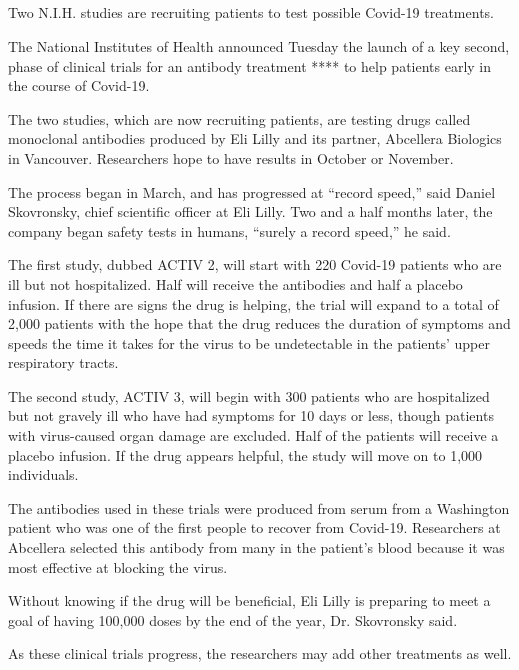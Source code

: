 \hypertarget{-6}{%
\subsection{}\label{-6}}

Two N.I.H. studies are recruiting patients to test possible Covid-19
treatments.

The National Institutes of Health announced Tuesday the launch of a key
second, phase of clinical trials for an antibody treatment **** to help
patients early in the course of Covid-19.

The two studies, which are now recruiting patients, are testing drugs
called monoclonal antibodies produced by Eli Lilly and its partner,
Abcellera Biologics in Vancouver. Researchers hope to have results in
October or November.

The process began in March, and has progressed at ``record speed,'' said
Daniel Skovronsky, chief scientific officer at Eli Lilly. Two and a half
months later, the company began safety tests in humans, ``surely a
record speed,'' he said.

The first study, dubbed ACTIV 2, will start with 220 Covid-19 patients
who are ill but not hospitalized. Half will receive the antibodies and
half a placebo infusion. If there are signs the drug is helping, the
trial will expand to a total of 2,000 patients with the hope that the
drug reduces the duration of symptoms and speeds the time it takes for
the virus to be undetectable in the patients' upper respiratory tracts.

The second study, ACTIV 3, will begin with 300 patients who are
hospitalized but not gravely ill who have had symptoms for 10 days or
less, though patients with virus-caused organ damage are excluded. Half
of the patients will receive a placebo infusion. If the drug appears
helpful, the study will move on to 1,000 individuals.

The antibodies used in these trials were produced from serum from a
Washington patient who was one of the first people to recover from
Covid-19. Researchers at Abcellera selected this antibody from many in
the patient's blood because it was most effective at blocking the virus.

Without knowing if the drug will be beneficial, Eli Lilly is preparing
to meet a goal of having 100,000 doses by the end of the year, Dr.
Skovronsky said.

As these clinical trials progress, the researchers may add other
treatments as well.

